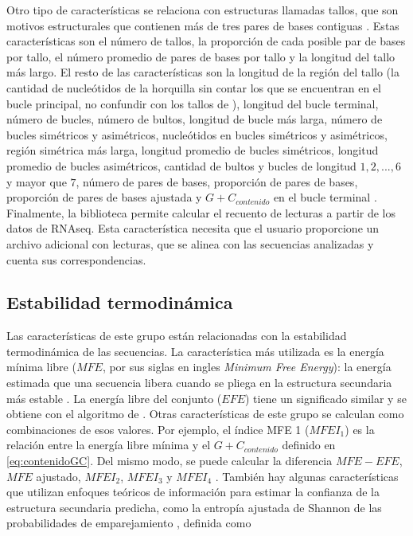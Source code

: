 Otro tipo de características se relaciona con estructuras llamadas tallos, que son motivos estructurales que contienen más de tres pares de bases contiguas
\citep{ng2007novo}. Estas características son el número de tallos, la proporción de cada posible par de bases por tallo, el número promedio de pares de bases
por tallo y la longitud del tallo más largo. El resto de las características son la longitud de la región del tallo (la cantidad de nucleótidos de la horquilla
sin contar los que se encuentran en el bucle principal, no confundir con los tallos de \cite{ng2007novo}), longitud del bucle terminal, número de bucles, número
de bultos, longitud de bucle más larga, número de bucles simétricos y asimétricos, nucleótidos en bucles simétricos y asimétricos, región simétrica más larga,
longitud promedio de bucles simétricos, longitud promedio de bucles asimétricos, cantidad de bultos y bucles de longitud $ 1,2, ..., 6$ y mayor que $7$, número
de pares de bases, proporción de pares de bases, proporción de pares de bases ajustada y $G+C_{contenido}$ en el bucle terminal \citep{Lopes2014}. Finalmente,
la biblioteca permite calcular el recuento de lecturas a partir de los datos de RNAseq. Esta característica necesita que el usuario proporcione un archivo
adicional con lecturas, que se alinea con las secuencias analizadas y cuenta sus correspondencias.

\subsection{Estabilidad termodinámica}

Las características de este grupo están relacionadas con la estabilidad termodinámica de las secuencias. La característica más utilizada es la energía
mínima libre ($MFE$, por sus siglas en ingles \textit{Minimum Free Energy}): la energía estimada que una secuencia libera cuando se pliega en la
estructura secundaria más estable \citep{zuker1981optimal}. La energía libre del conjunto ($EFE$) tiene un significado similar y se obtiene con el
algoritmo de \cite{mccaskill1990}. Otras características de este grupo se calculan como combinaciones de esos valores. Por ejemplo, el índice MFE 1
($MFEI_{1}$) es la relación entre la energía libre mínima y el ${G+C}_{contenido}$ definido en \ref{eq:contenidoGC}. Del mismo modo, se puede calcular
la diferencia $MFE-EFE$, $MFE$ ajustado, $MFEI_{2}$, $MFEI_{3}$ y $MFEI_{4}$ \citep{batuwita2009micropred}. También hay algunas características que
utilizan enfoques teóricos de información para estimar la confianza de la estructura secundaria predicha, como la entropía ajustada de Shannon de las
probabilidades de emparejamiento \citep{ng2007novo}, definida como

